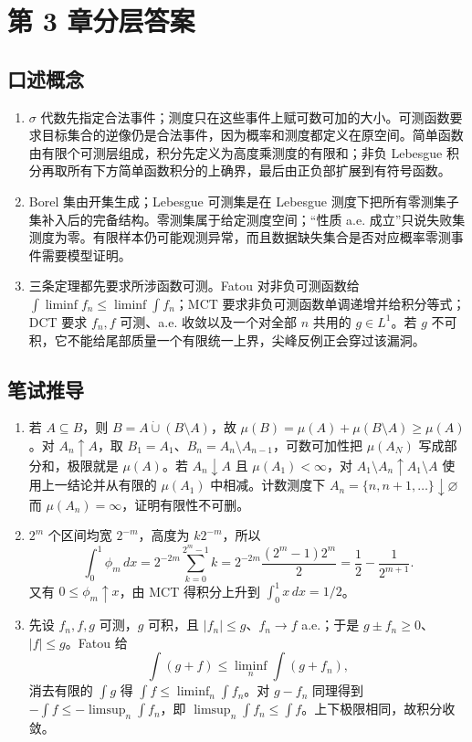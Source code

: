 \chapter{第 3 章分层答案}
\label{app:ch03-solutions}

\section*{口述概念}

\begin{enumerate}[leftmargin=*]
  \item $\sigma$ 代数先指定合法事件；测度只在这些事件上赋可数可加的大小。可测函数要求目标集合的逆像仍是合法事件，因为概率和测度都定义在原空间。简单函数由有限个可测层组成，积分先定义为高度乘测度的有限和；非负 Lebesgue 积分再取所有下方简单函数积分的上确界，最后由正负部扩展到有符号函数。
  \item Borel 集由开集生成；Lebesgue 可测集是在 Lebesgue 测度下把所有零测集子集补入后的完备结构。零测集属于给定测度空间；“性质 a.e. 成立”只说失败集测度为零。有限样本仍可能观测异常，而且数据缺失集合是否对应概率零测事件需要模型证明。
  \item 三条定理都先要求所涉函数可测。Fatou 对非负可测函数给 $\int\liminf f_n\leq\liminf\int f_n$；MCT 要求非负可测函数单调递增并给积分等式；DCT 要求 $f_n,f$ 可测、a.e. 收敛以及一个对全部 $n$ 共用的 $g\in L^1$。若 $g$ 不可积，它不能给尾部质量一个有限统一上界，尖峰反例正会穿过该漏洞。
\end{enumerate}

\section*{笔试推导}

\begin{enumerate}[leftmargin=*]
  \item 若 $A\subseteq B$，则 $B=A\dot\cup(B\setminus A)$，故 $\mu(B)=\mu(A)+\mu(B\setminus A)\geq\mu(A)$。对 $A_n\uparrow A$，取 $B_1=A_1$、$B_n=A_n\setminus A_{n-1}$，可数可加性把 $\mu(A_N)$ 写成部分和，极限就是 $\mu(A)$。若 $A_n\downarrow A$ 且 $\mu(A_1)<\infty$，对 $A_1\setminus A_n\uparrow A_1\setminus A$ 使用上一结论并从有限的 $\mu(A_1)$ 中相减。计数测度下 $A_n=\{n,n+1,\ldots\}\downarrow\varnothing$ 而 $\mu(A_n)=\infty$，证明有限性不可删。
  \item $2^m$ 个区间均宽 $2^{-m}$，高度为 $k2^{-m}$，所以
  \[
   \int_0^1\phi_m\,dx
   =2^{-2m}\sum_{k=0}^{2^m-1}k
   =2^{-2m}\frac{(2^m-1)2^m}{2}
   =\frac12-\frac1{2^{m+1}}.
  \]
  又有 $0\leq\phi_m\uparrow x$，由 MCT 得积分上升到 $\int_0^1x\,dx=1/2$。
  \item 先设 $f_n,f,g$ 可测，$g$ 可积，且 $|f_n|\leq g$、$f_n\to f$ a.e.；于是 $g\pm f_n\geq0$、$|f|\leq g$。Fatou 给
  \[
   \int(g+f)\leq\liminf_n\int(g+f_n),
  \]
  消去有限的 $\int g$ 得 $\int f\leq\liminf_n\int f_n$。对 $g-f_n$ 同理得到 $-\int f\leq-\limsup_n\int f_n$，即 $\limsup_n\int f_n\leq\int f$。上下极限相同，故积分收敛。
\end{enumerate}

